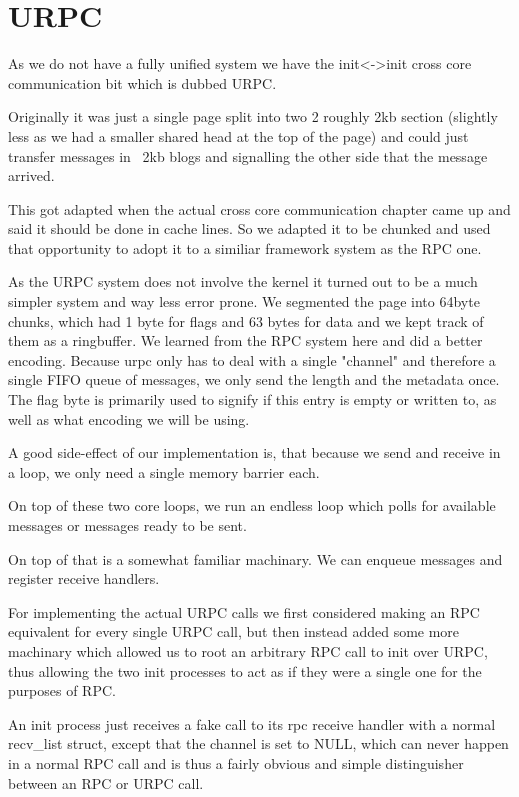 \section{URPC}\label{s:URPC}

As we do not have a fully unified system we have the init<->init cross core 
communication bit which is dubbed URPC.
\medskip

Originally it was just a single page split into two 2 roughly 2kb section 
(slightly less as we had a smaller shared head at the top of the page) and 
could just transfer messages in ~2kb blogs and signalling the other side that 
the message arrived.
\medskip

This got adapted when the actual cross core communication chapter came up and 
said it should be done in cache lines. So we 
adapted it to be chunked and used that opportunity to adopt it to a similiar 
framework system as the RPC one.
\medskip

As the URPC system does not involve the kernel it turned out to be a much 
simpler system and way less error prone. We segmented the page into 64byte chunks, which had 1 byte 
for flags and 63 bytes for data and we kept track of them as a ringbuffer. We 
learned from the RPC system here and did a better encoding. Because urpc only has to deal with a single "channel" and therefore a single FIFO queue of messages, we only send the length and the metadata once. 
The flag byte is primarily used to signify if this entry is empty or written 
to, as well as what encoding we will be using. 
\medskip

A good side-effect of our implementation is, that because we send and receive in a loop, we only need a single 
memory barrier each. 
\medskip

On top of these two core loops, we run an endless loop which polls for available messages or messages ready to be sent.
\medskip

On top of that is a somewhat 
familiar machinary. We can enqueue messages and register receive handlers. 
\medskip

For implementing the actual URPC calls we first considered making an RPC 
equivalent for every single URPC call, but then instead added some more 
machinary which allowed us to root an arbitrary RPC call to init over 
URPC, thus allowing the two init processes to act as if they were a single one 
for the purposes of RPC.
\medskip

An init process just receives a fake call to its rpc receive handler with a 
normal recv\_list struct, except that the channel is set to NULL, which can 
never happen in a normal RPC call and is thus a fairly obvious and simple 
distinguisher between an RPC or URPC call.
\medskip

